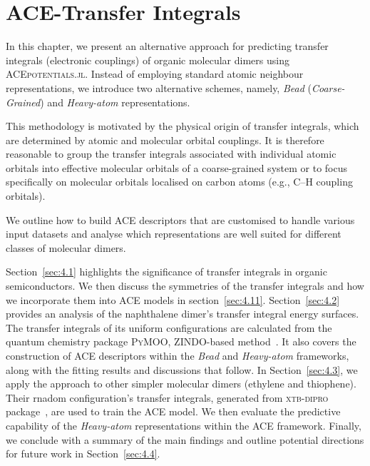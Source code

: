 \chapter{ACE-Transfer Integrals} \label{ch:4}

In this chapter, we present an alternative approach for predicting transfer integrals (electronic couplings) of organic molecular dimers using \textsc{ACEpotentials.jl}. Instead of employing standard atomic neighbour representations, we introduce two alternative schemes, namely, \textit{Bead} (\textit{Coarse-Grained}) and \textit{Heavy-atom} representations.

This methodology is motivated by the physical origin of transfer integrals, which are determined by atomic and molecular orbital couplings.
It is therefore reasonable to group the transfer integrals associated with individual atomic orbitals into effective molecular orbitals of a coarse-grained system or to focus specifically on molecular orbitals localised on carbon atoms (e.g., C–H coupling orbitals).

We outline how to build ACE descriptors that are customised to handle various input datasets and  analyse which representations are well suited for different classes of molecular dimers.

Section~\ref{sec:4.1} highlights the significance of transfer integrals in organic semiconductors.
We then discuss the symmetries of the transfer integrals and how we incorporate them into ACE models in section~\ref{sec:4.11}.
Section~\ref{sec:4.2} provides an analysis of the naphthalene dimer's transfer integral energy surfaces.
The transfer integrals of its uniform configurations are calculated from the quantum chemistry package \textsc{PyMOO}, ZINDO-based method~\cite{Kirkpatrick2007}.
It also covers the construction of ACE descriptors within the \textit{Bead} and \textit{Heavy-atom} frameworks, along with the fitting results and discussions that follow.
In Section~\ref{sec:4.3}, we apply the approach to other simpler molecular dimers (ethylene and thiophene). Their rnadom configuration's transfer integrals, generated from \textsc{xtb-dipro} package~\cite{Kohn2023}, are used to train the ACE model. 
We then evaluate the predictive capability of the \textit{Heavy-atom} representations within the ACE framework.
Finally, we conclude with a summary of the main findings and outline potential directions for future work in Section~\ref{sec:4.4}.

